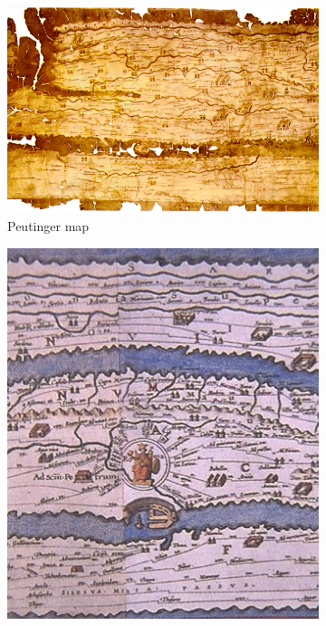\cbstart
\begin{figure}[!htb]
  \captionsetup[subfigure]{justification=centering}
  \centering
  \begin{subfigure}[b]{0.4\textwidth}
    \includegraphics[width=\textwidth]{images/history/peutinger.png}
    \caption{Peutinger map}
    \label{fig:peutinger}
  \end{subfigure}
  \hfill
  \begin{subfigure}[b]{0.4\textwidth}
    \includegraphics[width=\textwidth]{images/history/peutinger_rom.jpg}

\end{subfigure}
\end{figure}
